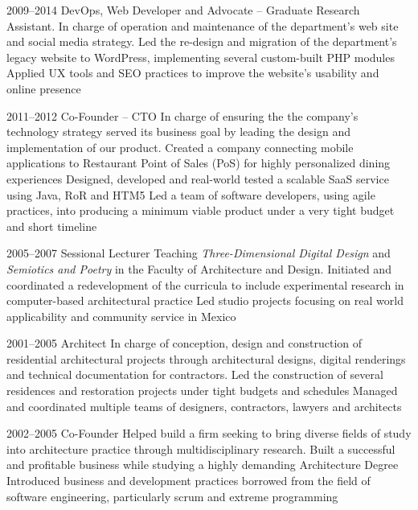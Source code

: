 \documentclass[full]{rvca}
\begin{document}
{2009--2014}
{DevOps, Web Developer and  Advocate -- Graduate Research Assistant.} %
{In charge of operation and maintenance of the department's web site and social media strategy.}
{Led the re-design and migration of the department's legacy website to WordPress, implementing several custom-built PHP modules}
{Applied UX tools and SEO practices to improve the website's usability and online presence}
{}
{}

{2011--2012}
{Co-Founder -- CTO} %
{In charge of ensuring the the company's technology strategy served its business goal by leading the design and implementation of our product.} %
{Created a company connecting mobile applications to Restaurant Point of Sales (PoS) for highly personalized dining experiences}
{Designed, developed and real-world tested a scalable SaaS service using Java, RoR and HTM5}
{Led a team of software developers, using agile practices, into producing a minimum viable product under a very tight budget and short timeline}
{}
{}

{2005--2007}
{Sessional Lecturer} %
{Teaching \emph{Three-Dimensional Digital Design} and \emph{Semiotics and Poetry} in the Faculty of Architecture and Design.} %
{Initiated and coordinated a redevelopment of the curricula to include experimental research in computer-based architectural practice}
{Led studio projects focusing on real world applicability and community service in Mexico}
{}
{}
{}

{2001--2005}
{Architect} %
{In charge of conception, design and construction of residential architectural projects through architectural designs, digital renderings and technical documentation for contractors.} %
{Led the construction of several residences and restoration projects under tight budgets and schedules}
{Managed and coordinated multiple teams of designers, contractors, lawyers and architects}
{}
{}
{}

{2002--2005}
{Co-Founder} %
{Helped build a firm seeking to bring diverse fields of study into architecture practice through multidisciplinary research.} %
{Built a successful and profitable business while studying a highly demanding Architecture Degree}
{Introduced business and development practices borrowed from the field of software engineering, particularly scrum and extreme programming}
{}
{}
{}
\end{document}
